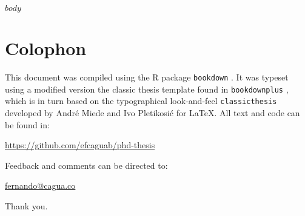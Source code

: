 

$body$

%
\printbibliography[
heading=bibintoc
]

\label{app:bibliography} %
%
\manualmark
\markboth{\spacedlowsmallcaps{\bibname}}{\spacedlowsmallcaps{\bibname}}
%

%
% 
%
% 
%

\cleardoublepage
\pagestyle{empty}

\hfill

\vfill


\section*{Colophon}
This document was compiled using the R package \texttt{bookdown} \autocites{bookdown_package}{bookdown_book}. It was typeset using a modified version the classic thesis template found in \texttt{bookdownplus} \autocites{bookdownplus_package}, which is in turn based on the typographical look-and-feel \texttt{classicthesis} developed by Andr\'e Miede and Ivo Pletikosić for \LaTeX. All text and code can be found in:
\begin{center}
\url{https://github.com/efcaguab/phd-thesis}
\end{center}
Feedback and comments can be directed to:
\begin{center}
\url{fernando@cagua.co}
\end{center}
Thank you.

